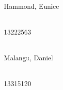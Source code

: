 \begin{titlepage}
\begin{center}
		
		\begin{minipage}{0.4\textwidth}
			\begin{flushleft} \large
				\emph{} \\
				Hammond, Eunice
			\end{flushleft}
		\end{minipage}
		\begin{minipage}{0.4\textwidth}
			\begin{flushright} \large
				\emph{} \\
				13222563
			\end{flushright}
		\end{minipage}
		
		       
		\begin{minipage}{0.4\textwidth}
			\begin{flushleft} \large
				\emph{} \\
				Malangu, Daniel
			\end{flushleft}
		\end{minipage}
		\begin{minipage}{0.4\textwidth}
			\begin{flushright} \large
				\emph{} \\
				13315120
			\end{flushright}
		\end{minipage}
				
	\end{center}
\end{titlepage}
